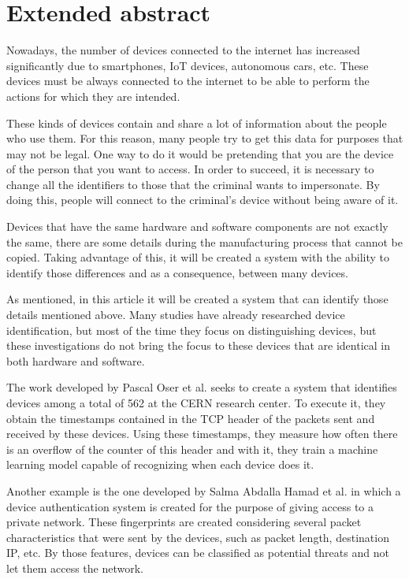 
\chapter*{Extended abstract}
 \label{chap:abstract}

Nowadays, the number of devices connected to the internet has increased significantly due to smartphones, IoT devices, autonomous cars, etc. These devices must be always connected to the internet to be able to perform the actions for which they are intended. 


These kinds of devices contain and share a lot of information about the people who use them. For this reason, many people try to get this data for purposes that may not be legal. One way to do it would be pretending that you are the device of the person that you want to access. In order to succeed, it is necessary to change all the identifiers to those that the criminal wants to impersonate. By doing this, people will connect to the criminal's device without being aware of it.


Devices that have the same hardware and software components are not exactly the same, there are some details during the manufacturing process that cannot be copied. Taking advantage of this, it will be created a system with the ability to identify those differences and as a consequence, between many devices.


As mentioned, in this article it will be created a system that can identify those details mentioned above. Many studies have already researched device identification, but most of the time they focus on distinguishing devices, but these investigations do not bring the focus to these devices that are identical in both hardware and software. 


The work developed by Pascal Oser et al. \cite{oser2018identifying} seeks to create a system that identifies devices among a total of 562 at the CERN research center. To execute it, they obtain the timestamps contained in the TCP header of the packets sent and received by these devices. Using these timestamps, they measure how often there is an overflow of the counter of this header and with it, they train a machine learning model capable of recognizing when each device does it.


Another example is the one developed by Salma Abdalla Hamad et al. \cite{hamad2019iot} in which a device authentication system is created for the purpose of giving access to a private network. These fingerprints are created considering several packet characteristics that were sent by the devices, such as packet length, destination IP, etc. By those features, devices can be classified as potential threats and not let them access the network. 


